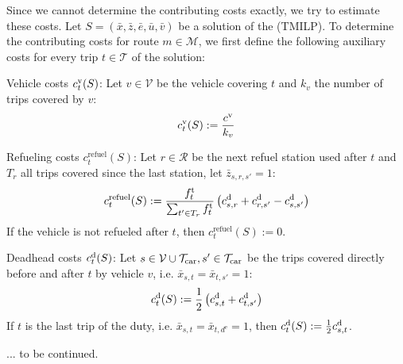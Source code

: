 Since we cannot determine the contributing costs exactly, we try to estimate these costs. Let $S=\left(\bar{x},\bar{z},\bar{e},\bar{u},\bar{v}\right)$ be a solution of the (TMILP). To determine the contributing costs for route $m\in\mathcal{M}$, we first define the following auxiliary costs for every trip $t\in\mathcal{T}$ of the solution:

\begin{definition}

Vehicle costs $c^{\operatorname{v}}_t(S)$: Let $v\in\mathcal{V}$ be the vehicle covering $t$ and $k_v$ the number of trips covered by $v$:
\begin{equation}
	c^{\operatorname{v}}_t(S) := \frac{c^{\operatorname{v}}}{k_v}
\end{equation}

Refueling costs $c^{\operatorname{refuel}}_t(S)$: Let $r\in\mathcal{R}$ be the next refuel station used after $t$ and $T_r$ all trips covered since the last station, let $\bar{z}_{s,r,s'} = 1$:
\begin{equation}
	c^{\operatorname{refuel}}_t(S) := \frac{f^{\operatorname{t}}_t}{\sum_{t'\in T_r} f^{\operatorname{t}}_t}\left(c^{\operatorname{d}}_{s,r}+c^{\operatorname{d}}_{r,s'}-c^{\operatorname{d}}_{s,s'}\right)
\end{equation}
If the vehicle is not refueled after $t$, then $c^{\operatorname{refuel}}_t(S) := 0$.

Deadhead costs $c^{\operatorname{d}}_t(S)$: Let $s\in\mathcal{V}\cup\mathcal{T}_{\operatorname{car}},s'\in\mathcal{T}_{\operatorname{car}}$ be the trips covered directly before and after $t$ by vehicle $v$, i.e. $\bar{x}_{s,t}=\bar{x}_{t,s'}=1$:
\begin{equation}
	c^{\operatorname{d}}_t(S) := \frac 1 2 \left(c^{\operatorname{d}}_{s,t}+c^{\operatorname{d}}_{t,s'}\right)
\end{equation}
If $t$ is the last trip of the duty, i.e. $\bar{x}_{s,t}=\bar{x}_{t,d^{\operatorname{e}}}=1$, then $c^{\operatorname{d}}_t(S) := \frac 1 2 c^{\operatorname{d}}_{s,t}$.

\end{definition}

... to be continued.

